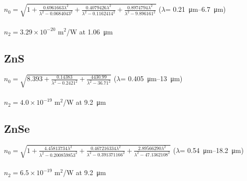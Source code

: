 \subsection*{}
$n_0=\sqrt{1+\frac{0.6961663\lambda^2}{\lambda^2-0.0684043^2}+\frac{0.4079426\lambda^2}{\lambda^2-0.1162414^2}+\frac{0.8974794\lambda^2}{\lambda^2-9.896161^2}}$ (\(\lambda\)= \SIrange{0.21}{6.7}{\micro\meter}) \cite{Malitson-1965}\\
\\
$n_2 = 3.29\times 10^{-20}$ m$^2$/W at \SI{1.06}{\micro\meter} \cite{Sheik-Bahae-1991}

\subsection*{ZnS}
$n_0=\sqrt{8.393+\frac{0.14383}{\lambda^2-0.2421^{2}}+\frac{4430.99}{\lambda^2-36.71^{2}}}$ (\(\lambda\)= \SIrange{0.405}{13}{\micro\meter}) \cite{Klein-1986}\\
\\
$n_2 = 4.0\times 10^{-19}$ m$^2$/W at \SI{9.2}{\micro\meter} \cite{Polyanskiy-2023}

\subsection*{ZnSe}
$n_0=\sqrt{1+\frac{4.45813734\lambda^2}{\lambda^2-0.200859853^2}+\frac{0.467216334\lambda^2}{\lambda^2-0.391371166^2}+\frac{2.89566290\lambda^2}{\lambda^2-47.1362108^2}}$ (\(\lambda\)= \SIrange{0.54}{18.2}{\micro\meter}) \cite{Tatian-1984}\\
\\
$n_2 = 6.5\times 10^{-19}$ m$^2$/W at \SI{9.2}{\micro\meter} \cite{Polyanskiy-2023}
